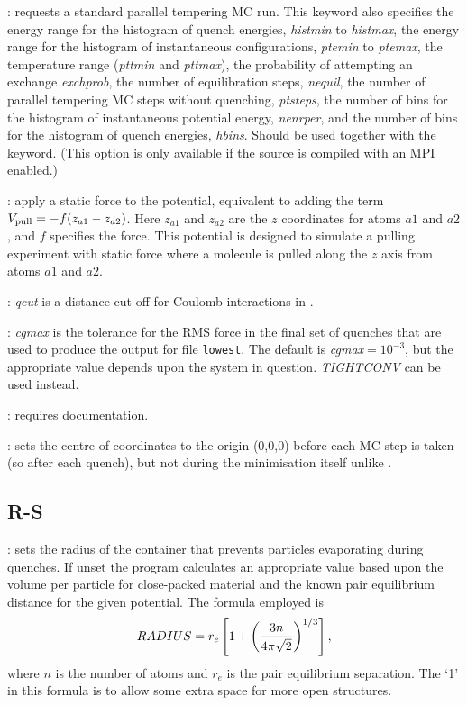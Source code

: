 : 
requests a standard parallel tempering MC run.
This keyword also specifies the energy range for the histogram of quench energies,
{\it histmin\/} to {\it histmax\/},
the energy range for the histogram of instantaneous configurations, {\it ptemin} to {\it ptemax}, 
the temperature range ({\it pttmin} and {\it pttmax}), 
the probability of attempting an exchange {\it exchprob}, the 
number of equilibration steps, {\it nequil},
the number of parallel tempering MC steps without quenching,  {\it ptsteps},
the number of bins for the histogram of instantaneous potential energy, {\it nenrper}, and
the number of bins for the histogram of quench energies, {\it hbins}.
Should be used together with the {\/} keyword. %
(This option is only available if the source is compiled with an MPI enabled.)  

: apply a static force to the potential, equivalent to adding
the term $V_{\rm pull}=-f(z_{a1}-z_{a2})$. Here $z_{a1}$ and $z_{a2}$ are the $z$
coordinates for atoms $a1$ and $a2$, and $f$ specifies the force.
This potential is designed to simulate a pulling experiment with static force where
a molecule is pulled along the $z$ axis from atoms $a1$ and $a2$.

: {\it qcut\/} is a distance cut-off for Coulomb interactions in {\/}.

: {\it cgmax\/} is the tolerance for the 
RMS force in the final set of quenches that are used to produce
the output for file {\tt lowest}. The default is 
{\it cgmax\/}$=10^{-3}$, but the appropriate value depends upon the system in question.
{\it TIGHTCONV} can be used instead.

: requires documentation.

: sets the centre of coordinates to the origin (0,0,0) before each MC step is taken (so after each quench), but not during the minimisation itself unlike {}. 

\subsection{R-S}
: sets the radius of the container that prevents particles
evaporating during quenches. If unset the program calculates an appropriate value
based upon the volume per particle for close-packed material and the known pair
equilibrium distance for the given potential. The formula employed is
$$  RADIUS=r_e\left[1 + \left(3 n \over 4\pi\sqrt{2}\right)^{1/3}\right], $$
where $n$ is the number of atoms and $r_e$ is the pair equilibrium
separation.\cite{kittel76} The `1' in this formula is to allow some extra space for
more open structures.

